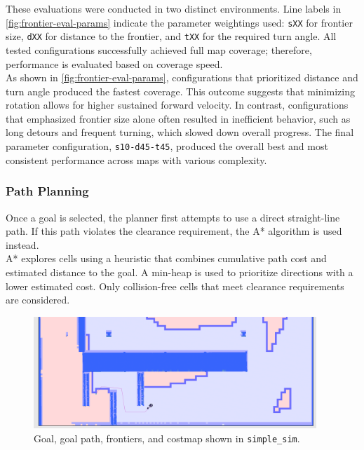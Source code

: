 These evaluations were conducted in two distinct environments. Line labels in \cref{fig:frontier-eval-params} indicate the parameter weightings used: \texttt{sXX} for frontier size, \texttt{dXX} for distance to the frontier, and \texttt{tXX} for the required turn angle. All tested configurations successfully achieved full map coverage; therefore, performance is evaluated based on coverage speed. \\

As shown in \cref{fig:frontier-eval-params}, configurations that prioritized distance and turn angle produced the fastest coverage. This outcome suggests that minimizing rotation allows for higher sustained forward velocity. In contrast, configurations that emphasized frontier size alone often resulted in inefficient behavior, such as long detours and frequent turning, which slowed down overall progress. The final parameter configuration, \texttt{s10-d45-t45}, produced the overall best  and most consistent performance across maps with various complexity.

\subsubsection{Path Planning}
\label{sec:path_planning}
Once a goal is selected, the planner first attempts to use a direct straight-line path. If this path violates the clearance requirement, the A* algorithm is used instead. \\

A* explores cells using a heuristic that combines cumulative path cost and estimated distance to the goal. A min-heap is used to prioritize directions with a lower estimated cost. Only collision-free cells that meet clearance requirements are considered.

\begin{figure}[H]
  \begin{center}
    \includegraphics[width=0.95\textwidth]{./figures/screenshots/path-planning.png}
  \end{center}
    \caption{Goal, goal path, frontiers, and costmap shown in \texttt{simple\_sim}.}
  \label{fig:path_planning}
\end{figure}


